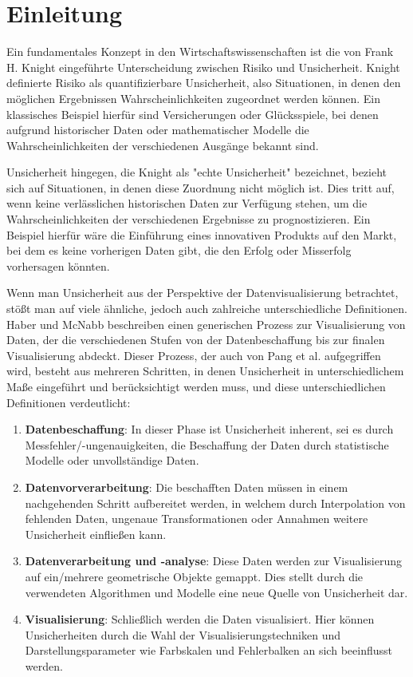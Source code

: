 \section{Einleitung}
Ein fundamentales Konzept in den Wirtschaftswissenschaften ist die von Frank H. Knight eingeführte Unterscheidung zwischen Risiko und 
Unsicherheit. Knight definierte Risiko als quantifizierbare Unsicherheit, also Situationen, in denen den möglichen Ergebnissen 
Wahrscheinlichkeiten zugeordnet werden können. Ein klassisches Beispiel hierfür sind Versicherungen oder Glücksspiele, bei denen 
aufgrund historischer Daten oder mathematischer Modelle die Wahrscheinlichkeiten der verschiedenen Ausgänge bekannt sind.

Unsicherheit hingegen, die Knight als "echte Unsicherheit" bezeichnet, bezieht sich auf Situationen, in denen diese Zuordnung nicht 
möglich ist. Dies tritt auf, wenn keine verlässlichen historischen Daten zur Verfügung stehen, um die Wahrscheinlichkeiten der 
verschiedenen Ergebnisse zu prognostizieren. Ein Beispiel hierfür wäre die Einführung eines innovativen Produkts auf den Markt, bei 
dem es keine vorherigen Daten gibt, die den Erfolg oder Misserfolg vorhersagen könnten. \cite{Knight1921}

Wenn man Unsicherheit aus der Perspektive der Datenvisualisierung betrachtet, stößt man auf viele ähnliche, jedoch auch zahlreiche 
unterschiedliche Definitionen. Haber und McNabb \cite{Haber1990} beschreiben einen generischen Prozess zur Visualisierung von Daten, 
der die verschiedenen Stufen von der Datenbeschaffung bis zur finalen Visualisierung abdeckt. Dieser Prozess, der auch von Pang et al. \cite{Pang1997} 
aufgegriffen wird, besteht aus mehreren Schritten, in denen Unsicherheit in unterschiedlichem Maße eingeführt und berücksichtigt
werden muss, und diese unterschiedlichen Definitionen verdeutlicht:

\begin{enumerate}
    \item \textbf{Datenbeschaffung}:
    In dieser Phase ist Unsicherheit inherent, sei es durch Messfehler/-ungenauigkeiten, die Beschaffung der Daten durch statistische Modelle oder unvollständige Daten.
    
    \item \textbf{Datenvorverarbeitung}:
    Die beschafften Daten müssen in einem nachgehenden Schritt aufbereitet werden, in welchem durch Interpolation von fehlenden Daten, ungenaue Transformationen oder Annahmen weitere Unsicherheit einfließen kann.
    
    \item \textbf{Datenverarbeitung und -analyse}:
    Diese Daten werden zur Visualisierung auf ein/mehrere geometrische Objekte gemappt. Dies stellt durch die verwendeten Algorithmen und Modelle eine neue Quelle von Unsicherheit dar.
    
    \item \textbf{Visualisierung}:
    Schließlich werden die Daten visualisiert. Hier können Unsicherheiten durch die Wahl der Visualisierungstechniken und Darstellungsparameter wie Farbskalen und Fehlerbalken an sich beeinflusst werden.
\end{enumerate}


